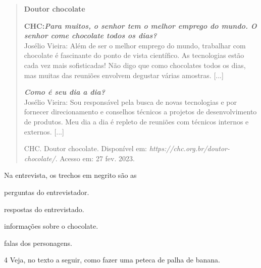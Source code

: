 \begin{quote}
\textbf{Doutor chocolate}

\textbf{CHC:\emph{Para muitos, o senhor tem o melhor emprego do mundo.
O senhor come chocolate todos os dias?}}\\
Josélio Vieira: Além de ser o melhor emprego do mundo, trabalhar com
chocolate é fascinante do ponto de vista científico. As tecnologias
estão cada vez mais sofisticadas! Não digo que como chocolates todos os
dias, mas muitas das reuniões envolvem degustar várias amostras.
{[}...{]}

\emph{\textbf{Como é seu dia a dia?}}\\
Josélio Vieira: Sou responsável pela busca de novas tecnologias e por fornecer
direcionamento e conselhos técnicos a projetos de desenvolvimento de
produtos. Meu dia a dia é repleto de reuniões com técnicos internos e
externos. {[}...{]}

CHC. Doutor chocolate. Disponível em:
\emph{https://chc.org.br/doutor-chocolate/}. Acesso em: 27 fev. 2023.
\end{quote}

Na entrevista, os trechos em negrito são as

\begin{escolha}
\item perguntas do entrevistador.

\item respostas do entrevistado.

\item informações sobre o chocolate.

\item falas dos personagens.
\end{escolha}



\num{4} Veja, no texto a seguir, como fazer uma peteca de palha de banana.


